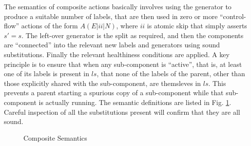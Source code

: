 The semantics of composite actions basically involves using the generator
to produce a suitable number of labels,
that are then used in zero or more ``control-flow'' actions
of the form $A(E|ii|N)$, where $ii$ is atomic skip that simply asserts $s'=s$.
The left-over generator is the split as required,
and then the components are ``connected'' into
the relevant new labels and generators using sound substitutions.
Finally the relevant healthiness conditions are applied.
A key principle is to ensure that when any sub-component is ``active'',
that is, at least one of its labels is present in $ls$,
that none of the labels of the parent,
other than those explicitly shared with the sub-component,
are themsleves in $ls$.
This prevents a parent starting a spurious copy of a sub-component
while that sub-component is actually running.
The semantic definitions are listed in Fig. \ref{fig:composite-semantics}.
Careful inspection of all the substitutions present will confirm that they
are all sound.
\begin{figure}[t]
  \caption{Composite Semantics}
  \label{fig:composite-semantics}
\end{figure}

